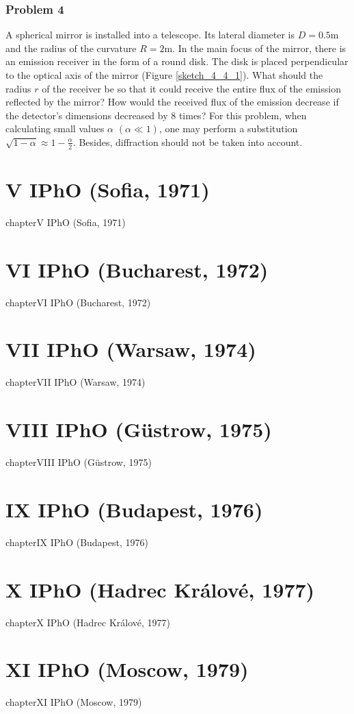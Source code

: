 \documentclass[12pt,a4paper]{book}
\begin{document}
	\subsection*{Problem 4}
	A spherical mirror is installed into a telescope. Its lateral diameter is $D=0.5\text{m}$ and the radius of the curvature $R=2\text{m}$. In the main focus of the mirror, there is an emission receiver in the form of a round disk. The disk is placed perpendicular to the optical axis of the mirror (Figure \ref{sketch_4_4_1}). What should the radius $r$ of the receiver be so that it could receive the entire flux of the emission reflected by the mirror? How would the received flux of the emission decrease if the detector's dimensions decreased by 8 times? For this problem, when calculating small values $\alpha$ $(\alpha\ll1)$, one may perform a substitution $\sqrt{1-\alpha}\approx1-\frac{\alpha}{2}$. Besides, dif\mbox{}fraction should not be taken into account.
\chapter*{V IPhO (Sof\mbox{}ia, 1971)}
{chapter}{V IPhO (Sof\mbox{}ia, 1971)}
\chapter*{VI IPhO (Bucharest, 1972)}
{chapter}{VI IPhO (Bucharest, 1972)}
\chapter*{VII IPhO (Warsaw, 1974)}
{chapter}{VII IPhO (Warsaw, 1974)}
\chapter*{VIII IPhO (G\"ustrow, 1975)}
{chapter}{VIII IPhO (G\"ustrow, 1975)}
\chapter*{IX IPhO (Budapest, 1976)}
{chapter}{IX IPhO (Budapest, 1976)}
\chapter*{X IPhO (Hadrec Kr\'alov\'e, 1977)}
{chapter}{X IPhO (Hadrec Kr\'alov\'e, 1977)}
\chapter*{XI IPhO (Moscow, 1979)}
{chapter}{XI IPhO (Moscow, 1979)}
\end{document}
